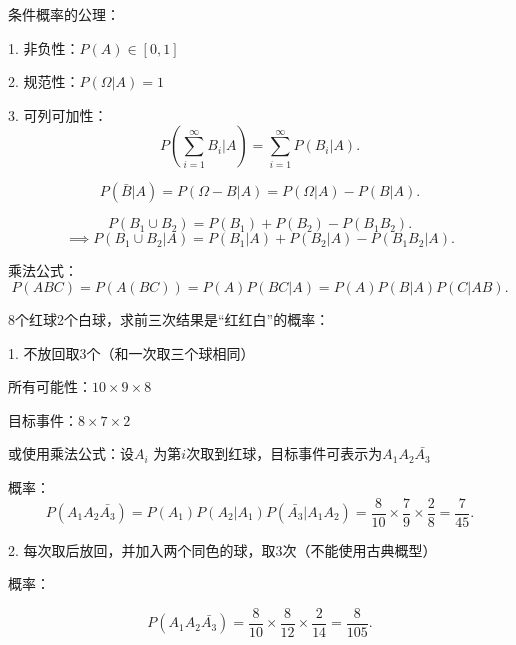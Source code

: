 \begin{axiom}
    条件概率的公理：

    1. 非负性：$P\left( A \right) \in \left[ 0,1 \right] $

    2. 规范性：$P\left( \Omega|A \right) =1$

    3. 可列可加性： \[
        P\left( \sum_{i=1}^{\infty} B_i|A \right) =\sum_{i=1}^{\infty} P\left( B_i|A \right) 
    .\] 
\end{axiom}
\begin{cor}
    \[
        P\left( \bar{B}|A \right) =P\left( \Omega-B|A \right) =P\left( \Omega|A \right) -P\left( B|A \right)
    .\] 
\end{cor}
\begin{cor}
    \[
        P\left( B_1\cup B_2 \right) =P\left( B_1 \right) +P\left( B_2 \right) -P\left( B_1B_2 \right) 
    .\] 
    \[
        \implies P\left( B_1\cup B_2|A \right) =P\left( B_1|A \right) +P\left( B_2|A \right) -P\left( B_1B_2|A \right) 
    .\] 
\end{cor}
\begin{cor}
    乘法公式：
    \[
        P\left( ABC \right) =P\left( A\left( BC \right)  \right) =P\left( A \right) P\left( BC|A \right) =P\left( A \right) P\left( B|A\right) P\left( C|AB \right)  
    .\] 
\end{cor}
\begin{eg}
    8个红球2个白球，求前三次结果是“红红白”的概率：

    1. 不放回取3个（和一次取三个球相同）

    所有可能性：$10\times 9\times 8$ 

    目标事件：$8\times 7\times 2$

    或使用乘法公式：设$A_i$ 为第$i$次取到红球，目标事件可表示为$A_1A_2\bar{A_3}$

    概率：\[
        P\left( A_1A_2\bar{A_3} \right) =P\left( A_1 \right) P\left( A_2|A_1 \right) P\left( \bar{A_3}|A_1A_2 \right) =\frac{8}{10}\times \frac{7}{9}\times \frac{2}{8}=\frac{7}{45}
    .\] 

    2. 每次取后放回，并加入两个同色的球，取3次（不能使用古典概型）

    概率：

    \[
        P\left( A_1A_2\bar{A_3} \right) =\frac{8}{10}\times \frac{8}{12}\times \frac{2}{14}=\frac{8}{105}
    .\] 
\end{eg}
